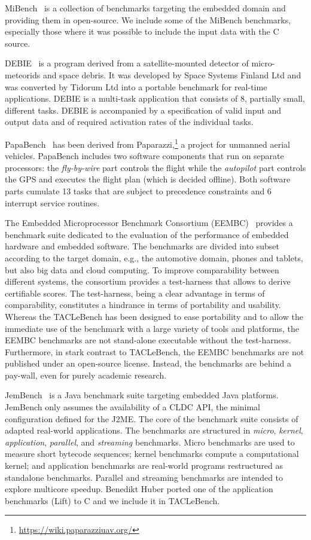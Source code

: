 \documentclass[a4paper,UKenglish]{oasics}
\newcommand{\martin}[1]{{\color{blue} Martin: #1}}
\renewcommand{\martin}[1]{}
\begin{document}
MiBench~\cite{MiBench} is a collection of benchmarks targeting the embedded
domain and providing them in open-source.
We include some of the MiBench benchmarks, especially
those where it was possible to include the input data with the C source.

DEBIE~\cite{debie} is a program derived from a satellite-mounted detector of micro-meteorids and space debris.
It was developed by Space Systems Finland Ltd and was converted by Tidorum Ltd into a portable benchmark for real-time applications.
DEBIE is a multi-task application that consists of 8, partially small, different tasks.
DEBIE is accompanied by a specification of valid input and output data and of required activation rates of the individual tasks.

PapaBench~\cite{papabench} has been derived from  Paparazzi,\footnote{\url{https://wiki.paparazziuav.org/}}
a project for unmanned aerial vehicles.  PapaBench includes
two software components that run on separate processors:
the \textit{fly-by-wire} part controls the flight while the \textit{autopilot} part controls the GPS and
executes the flight plan (which is decided offline). Both software parts  cumulate 13 tasks that are subject
to precedence constraints and 6 interrupt service routines.

The Embedded Microprocessor Benchmark Consortium (EEMBC)~\cite{eembc} provides a
benchmark suite dedicated to the evaluation of
the performance of embedded hardware and embedded software.
The benchmarks are divided into subset according to the target domain, e.g., the automotive domain, phones and tablets, but also big data and cloud computing.
To improve comparability between different systems, the consortium provides a
test-harness that allows to derive certifiable scores.
The test-harness, being a clear advantage in terms of comparability,
constitutes a hindrance in terms of portability and usability.
Whereas the TACLeBench has been designed to ease portability and to allow the immediate use of the benchmark with a large variety of tools and platforms, the EEMBC benchmarks are not stand-alone executable without the test-harness.
Furthermore, in stark contrast to TACLeBench, the EEMBC benchmarks are not published under an open-source license.
Instead, the benchmarks are behind a pay-wall, even for purely academic research.


JemBench~\cite{jembench} is a Java benchmark suite targeting
embedded Java platforms. JemBench only assumes the
availability of a CLDC API, the minimal configuration
defined for the J2ME. The core of the benchmark suite consists of
adapted real-world applications.
The benchmarks are structured in {\em micro}, {\em kernel}, {\em
application}, {\em parallel}, and {\em streaming} benchmarks.
Micro benchmarks are used to measure short bytecode sequences;
kernel benchmarks compute a computational kernel; and application
benchmarks are real-world programs restructured as standalone benchmarks.
Parallel and streaming benchmarks are intended to explore multicore
speedup.
Benedikt Huber ported one of the application benchmarks (Lift) to C
and we include it in TACLeBench.
\end{document}
